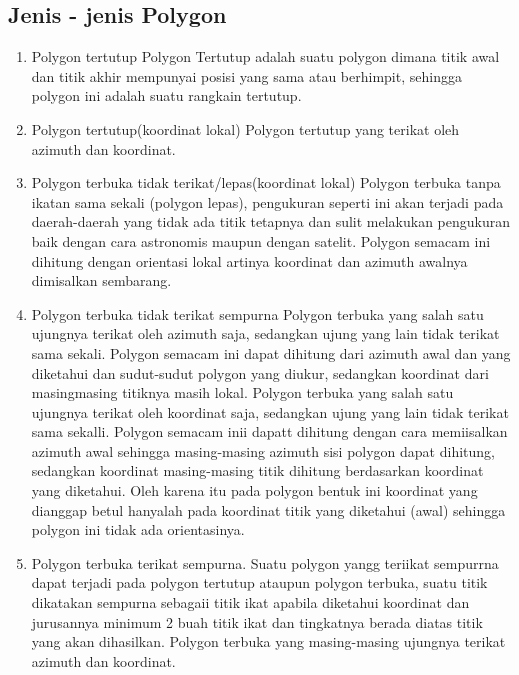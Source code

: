 \subsection{Jenis - jenis Polygon}
\begin{enumerate}
\item Polygon tertutup
  Polygon Tertutup adalah suatu polygon dimana titik awal dan titik akhir mempunyai posisi yang sama atau berhimpit, sehingga polygon ini adalah suatu rangkain tertutup.
\item Polygon tertutup(koordinat lokal)
  Polygon tertutup yang terikat oleh azimuth dan koordinat.
\item Polygon terbuka tidak terikat/lepas(koordinat lokal)
  Polygon terbuka tanpa ikatan sama sekali (polygon lepas), pengukuran seperti ini akan terjadi pada daerah-daerah yang tidak ada titik tetapnya dan sulit melakukan pengukuran baik dengan cara astronomis maupun dengan satelit. Polygon semacam ini dihitung dengan orientasi lokal artinya koordinat dan azimuth awalnya dimisalkan sembarang.
\item Polygon terbuka tidak terikat sempurna
  Polygon terbuka yang salah satu ujungnya terikat oleh azimuth saja, sedangkan ujung yang lain tidak terikat sama sekali. Polygon semacam ini dapat dihitung dari azimuth awal dan yang diketahui dan sudut-sudut polygon yang diukur, sedangkan koordinat dari masingmasing titiknya masih lokal. Polygon terbuka yang salah satu ujungnya terikat oleh koordinat saja, sedangkan ujung yang lain tidak terikat sama sekalli. Polygon semacam inii dapatt dihitung dengan cara memiisalkan azimuth awal sehingga masing-masing azimuth sisi polygon dapat dihitung, sedangkan koordinat masing-masing titik dihitung berdasarkan koordinat yang diketahui. Oleh karena itu pada polygon bentuk ini koordinat yang dianggap betul hanyalah pada koordinat titik yang diketahui (awal) sehingga polygon ini tidak ada orientasinya.
\item Polygon terbuka terikat sempurna.
  Suatu polygon yangg teriikat sempurrna dapat terjadi pada polygon tertutup ataupun polygon terbuka, suatu titik dikatakan sempurna sebagaii titik ikat apabila diketahui koordinat dan jurusannya minimum 2 buah titik ikat dan tingkatnya berada diatas titik yang akan dihasilkan. Polygon terbuka yang masing-masing ujungnya terikat azimuth dan koordinat.
\end{enumerate}

